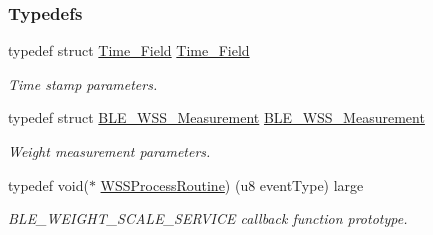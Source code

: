 \subsubsection*{Typedefs}
\begin{DoxyCompactItemize}
\item 
typedef struct \hyperlink{struct_time___field}{Time\+\_\+\+Field} \hyperlink{group___b_l_e___w_s_s_ga8d554aac0512406a308b84a3392623fa}{Time\+\_\+\+Field}\hypertarget{group___b_l_e___w_s_s_ga8d554aac0512406a308b84a3392623fa}{}\label{group___b_l_e___w_s_s_ga8d554aac0512406a308b84a3392623fa}

\begin{DoxyCompactList}\small\item\em Time stamp parameters. \end{DoxyCompactList}\item 
typedef struct \hyperlink{struct_b_l_e___w_s_s___measurement}{B\+L\+E\+\_\+\+W\+S\+S\+\_\+\+Measurement} \hyperlink{group___b_l_e___w_s_s_ga4ecfa8948f13f297933912ca4e8b8f4f}{B\+L\+E\+\_\+\+W\+S\+S\+\_\+\+Measurement}\hypertarget{group___b_l_e___w_s_s_ga4ecfa8948f13f297933912ca4e8b8f4f}{}\label{group___b_l_e___w_s_s_ga4ecfa8948f13f297933912ca4e8b8f4f}

\begin{DoxyCompactList}\small\item\em Weight measurement parameters. \end{DoxyCompactList}\item 
typedef void($\ast$ \hyperlink{group___b_l_e___w_s_s_ga2bc7cdc055649fbb18b2b58bea522557}{W\+S\+S\+Process\+Routine}) (u8 event\+Type) large\hypertarget{group___b_l_e___w_s_s_ga2bc7cdc055649fbb18b2b58bea522557}{}\label{group___b_l_e___w_s_s_ga2bc7cdc055649fbb18b2b58bea522557}

\begin{DoxyCompactList}\small\item\em B\+L\+E\+\_\+\+W\+E\+I\+G\+H\+T\+\_\+\+S\+C\+A\+L\+E\+\_\+\+S\+E\+R\+V\+I\+CE callback function prototype. \end{DoxyCompactList}\end{DoxyCompactItemize}

